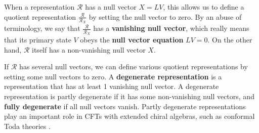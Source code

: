 \documentclass[12pt, a4paper]{article}
\newcommand{\myindex}[1]{\textbf{\boldmath #1}}
\begin{document}
When a representation $\mathcal{R}$ has a null vector $X{}=LV{}$, this allows us to define a quotient representation $\frac{\mathcal{R}}{\mathcal{R}_{X{}}}$ by setting the null vector to zero. 
By an abuse of terminology, we say that $\frac{\mathcal{R}}{\mathcal{R}_{X{}}}$ has a \myindex{vanishing null vector}, which really means that its primary state $V{}$ obeys the \myindex{null vector equation} $LV{}=0$. On the other hand, $\mathcal{R}$ itself has a non-vanishing null vector $X{}$. 

If $\mathcal{R}$ has several null vectors, we can define various quotient representations by setting some null vectors to zero. A \myindex{degenerate representation} is a representation that has at least 1 vanishing null vector. A degenerate representation is partly degenerate if it has some non-vanishing null vectors, and \myindex{fully degenerate} if all null vectors vanish. Partly degenerate representations play an important role in CFTs with extended chiral algebras, such as conformal Toda theories \cite{fl07c}. 
\end{document}
